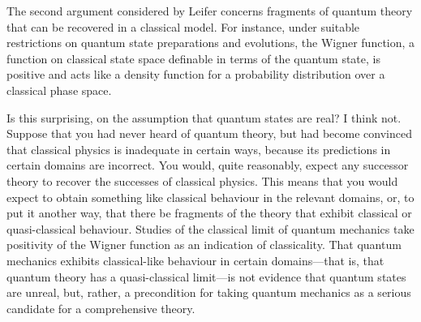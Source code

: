 \documentclass[12pt]{article}
\begin{document}
The second argument considered by Leifer concerns fragments of quantum theory that can be recovered in a classical model.  For instance, under suitable restrictions on quantum state preparations and evolutions, the Wigner function, a function on classical state space definable in terms of the quantum state, is positive and acts like a density function for a probability distribution over a classical phase space.

Is this surprising, on the assumption that quantum states are real?  I think not.  Suppose that you had never heard of quantum theory, but had become convinced that classical physics is inadequate in certain ways, because its predictions in certain domains are incorrect.  You would, quite reasonably, expect any successor theory to recover the successes of classical physics. This means that you would expect to obtain something like classical behaviour in the relevant domains, or, to put it another way, that there be fragments of the theory that exhibit classical or quasi-classical behaviour. Studies of the classical limit of quantum mechanics take positivity of the Wigner function as an indication of classicality. That quantum mechanics exhibits classical-like behaviour in certain domains---that is, that quantum theory has a quasi-classical limit---is not evidence that quantum states are unreal, but, rather, a precondition for taking quantum mechanics as a serious candidate for a comprehensive theory.
\end{document}
